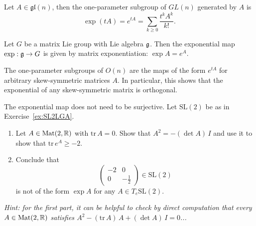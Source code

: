 \begin{proposition}\label{prop:expmat}
	Let $A\in\mathfrak{gl}(n)$, then the one-parameter subgroup of $GL(n)$ generated by $A$ is
	\begin{equation}
		\exp(tA) = e^{tA} = \sum_{k\geq 0} \frac{t^kA^k}{k!}.
	\end{equation}
\end{proposition}

\begin{corollary}
	Let $G$ be a matrix Lie group with Lie algebra $\mathfrak{g}$.
	Then the exponential map $\exp:\mathfrak{g}\to G$ is given by matrix exponentiation: $\exp A = e^A$.
\end{corollary}

\begin{exercise}
	The one-parameter subgroups of $O(n)$ are the maps of the form $e^{tA}$ for arbitrary skew-symmetric matrices $A$.
	In particular, this shows that the exponential of any skew-symmetric matrix is orthogonal.
\end{exercise}

\begin{exercise}
	The exponential map does not need to be surjective. Let $\mathrm{SL}(2)$ be as in Exercise~\ref{ex:SL2LGA}.
	\begin{enumerate}
		\item Let $A\in\mathrm{Mat}(2,\mathbb{R})$ with $\mathrm{tr}\,A = 0$. Show that $A^2 = -(\det A)\, I$ and use it to show that $\mathrm{tr}\, e^A\geq -2$.
		\item Conclude that
		      \begin{equation*}
			      \begin{pmatrix} -2 & 0 \\ 0 & -\frac12 \end{pmatrix}\in\mathrm{SL}(2)
		      \end{equation*}
		      is not of the form $\exp A$ for any $A\in T_e\mathrm{SL}(2)$.
	\end{enumerate}
	\textit{\small Hint: for the first part, it can be helpful to check by direct computation that every $A\in\mathrm{Mat}(2,\mathbb{R})$ satisfies $A^2 - (\mathrm{tr}\,A)\,A + (\det A)\,I = 0$...}
\end{exercise}

